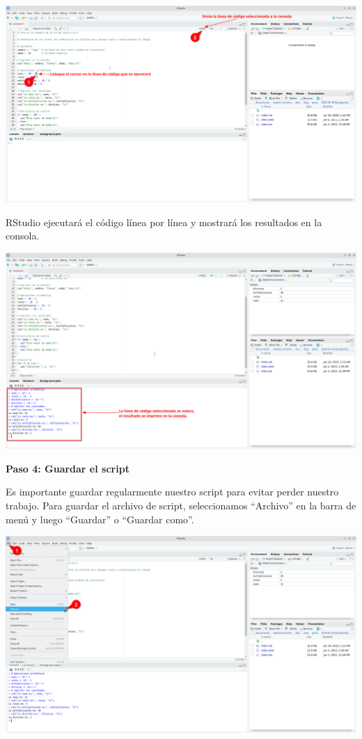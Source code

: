 \documentclass[
  letterpaper,
  DIV=11,
  numbers=noendperiod]{scrartcl}
\begin{document}
\includegraphics{images/Screenshot_20230611_005354.png}

RStudio ejecutará el código línea por línea y mostrará los resultados en
la consola.

\includegraphics{images/Screenshot_20230611_010256.png}

\textbf{Paso 4: Guardar el script}

Es importante guardar regularmente nuestro script para evitar perder
nuestro trabajo. Para guardar el archivo de script, seleccionamos
``Archivo'' en la barra de menú y luego ``Guardar'' o ``Guardar como''.

\includegraphics{images/Screenshot_20230611_010854.png}
\end{document}
